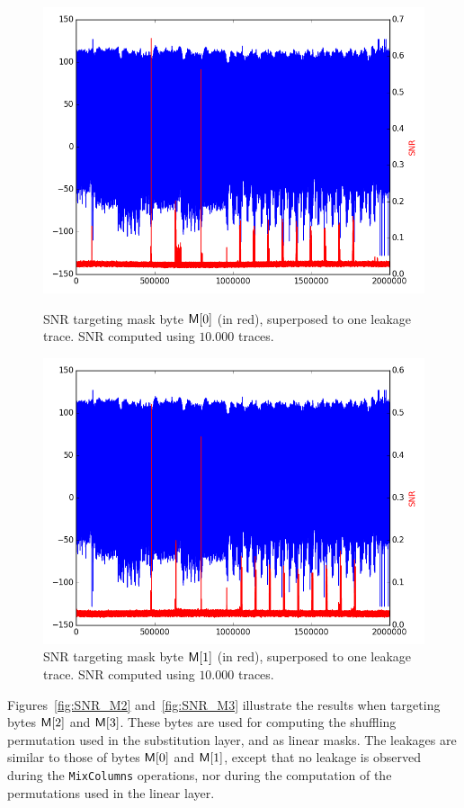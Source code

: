 \begin{figure}[H]
	\centering 
	\includegraphics[scale=0.35]{figures/2Mpts/SNR_M0_10ktraces.png}
	\caption{SNR targeting mask byte $\mathsf{M}[0]$ (in red), superposed to one leakage trace. SNR computed using $10.000$ traces.}
	\label{fig:SNR_M0}
	\includegraphics[scale=0.35]{figures/2Mpts/SNR_M1_10ktraces.png}
	\caption{SNR targeting mask byte $\mathsf{M}[1]$ (in red), superposed to one leakage trace. SNR computed using $10.000$ traces.}
	\label{fig:SNR_M1}
\end{figure}

Figures~\ref{fig:SNR_M2} and~\ref{fig:SNR_M3} illustrate the results when targeting bytes $\mathsf{M}[2]$ and $\mathsf{M}[3]$. 
These bytes are used for computing the shuffling permutation used in the substitution layer, and as linear masks.
The leakages are similar to those of bytes $\mathsf{M}[0]$ and $\mathsf{M}[1]$, except that no leakage is observed during the \texttt{MixColumns} operations, nor during the computation of the permutations used in the linear layer.

